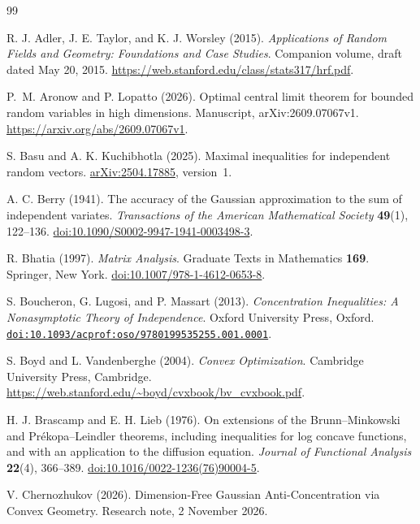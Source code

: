 \documentclass[11pt,letterpaper,twoside,leqno]{article}
\theoremstyle{bookplain}
\theoremstyle{bookremark}
\begin{document}
\begin{thebibliography}{99}
\setlength{\itemsep}{0pt}
{}
{R. J. Adler, J. E. Taylor, and K. J. Worsley (2015).
\emph{Applications of Random Fields and Geometry: Foundations and Case Studies}.
Companion volume, draft dated May 20, 2015.
\url{https://web.stanford.edu/class/stats317/hrf.pdf}.}

P.~M. Aronow and P. Lopatto (2026).
Optimal central limit theorem for bounded random variables in high dimensions.
Manuscript, arXiv:2609.07067v1.
\url{https://arxiv.org/abs/2609.07067v1}.

S. Basu and A. K. Kuchibhotla (2025).
Maximal inequalities for independent random vectors.
\href{https://arxiv.org/abs/2504.17885}{arXiv:2504.17885}, version~1.

A. C. Berry (1941).
The accuracy of the Gaussian approximation to the sum of independent variates.
\emph{Transactions of the American Mathematical Society} \textbf{49}(1), 122--136.
\href{https://doi.org/10.1090/S0002-9947-1941-0003498-3}{doi:10.1090/S0002-9947-1941-0003498-3}.

R. Bhatia (1997).
\emph{Matrix Analysis}.
Graduate Texts in Mathematics \textbf{169}. Springer, New York.
\href{https://doi.org/10.1007/978-1-4612-0653-8}{doi:10.1007/978-1-4612-0653-8}.

S. Boucheron, G. Lugosi, and P. Massart (2013).
\emph{Concentration Inequalities: A Nonasymptotic Theory of Independence}.
Oxford University Press, Oxford.
\href{https://doi.org/10.1093/acprof:oso/9780199535255.001.0001}{\nolinkurl{doi:10.1093/acprof:oso/9780199535255.001.0001}}.

S. Boyd and L. Vandenberghe (2004).
\emph{Convex Optimization}.
Cambridge University Press, Cambridge.
\url{https://web.stanford.edu/~boyd/cvxbook/bv_cvxbook.pdf}.

H. J. Brascamp and E. H. Lieb (1976).
On extensions of the Brunn--Minkowski and Pr\'ekopa--Leindler
theorems, including inequalities for log concave functions, and with
an application to the diffusion equation.
\emph{Journal of Functional Analysis} \textbf{22}(4), 366--389.
\href{https://doi.org/10.1016/0022-1236(76)90004-5}{doi:10.1016/0022-1236(76)90004-5}.

V. Chernozhukov (2026).
Dimension-Free Gaussian Anti-Concentration via Convex Geometry.
Research note, 2 November 2026.


\end{thebibliography}
\end{document}
